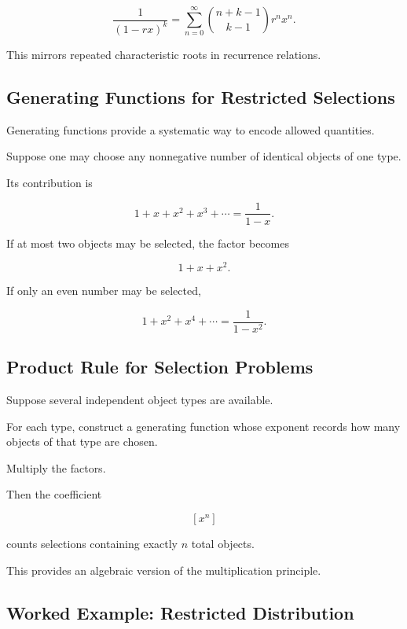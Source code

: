 \[
\boxed{
\frac{1}{(1-rx)^k}
=
\sum_{n=0}^{\infty}
\binom{n+k-1}{k-1}
r^n x^n.
}
\]

This mirrors repeated characteristic roots in recurrence relations.

\subsection{Generating Functions for Restricted Selections}
\label{subsec:gf-restricted-selections}

Generating functions provide a systematic way to encode allowed
quantities.

Suppose one may choose any nonnegative number of identical objects of
one type.

Its contribution is

\[
1+x+x^2+x^3+\cdots
=
\frac{1}{1-x}.
\]

If at most two objects may be selected, the factor becomes

\[
\boxed{
1+x+x^2.
}
\]

If only an even number may be selected,

\[
\boxed{
1+x^2+x^4+\cdots
=
\frac{1}{1-x^2}.
}
\]

\subsection{Product Rule for Selection Problems}
\label{subsec:gf-selection-product}

Suppose several independent object types are available.

For each type, construct a generating function whose exponent records
how many objects of that type are chosen.

Multiply the factors.

Then the coefficient

\[
[x^n]
\]

counts selections containing exactly \(n\) total objects.

This provides an algebraic version of the multiplication principle.

\subsection{Worked Example: Restricted Distribution}
\label{subsec:worked-gf-restricted-distribution}

